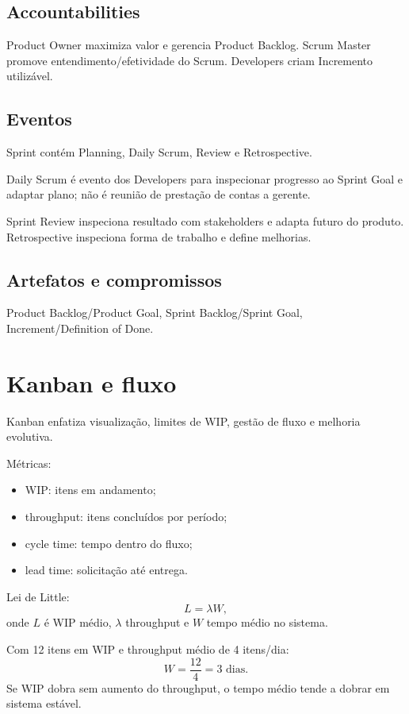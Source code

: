\subsection{Accountabilities}

Product Owner maximiza valor e gerencia Product Backlog. Scrum Master promove entendimento/efetividade do Scrum. Developers criam Incremento utilizável.

\subsection{Eventos}

Sprint contém Planning, Daily Scrum, Review e Retrospective.

Daily Scrum é evento dos Developers para inspecionar progresso ao Sprint Goal e adaptar plano; não é reunião de prestação de contas a gerente.

Sprint Review inspeciona resultado com stakeholders e adapta futuro do produto. Retrospective inspeciona forma de trabalho e define melhorias.

\subsection{Artefatos e compromissos}

Product Backlog/Product Goal, Sprint Backlog/Sprint Goal, Increment/Definition of Done.

\section{Kanban e fluxo}

Kanban enfatiza visualização, limites de WIP, gestão de fluxo e melhoria evolutiva.

Métricas:
\begin{itemize}
\item WIP: itens em andamento;
\item throughput: itens concluídos por período;
\item cycle time: tempo dentro do fluxo;
\item lead time: solicitação até entrega.
\end{itemize}

Lei de Little:
\[
L=\lambda W,
\]
onde $L$ é WIP médio, $\lambda$ throughput e $W$ tempo médio no sistema.

\begin{exemplo}
Com 12 itens em WIP e throughput médio de 4 itens/dia:
\[
W=\frac{12}{4}=3\text{ dias}.
\]
Se WIP dobra sem aumento do throughput, o tempo médio tende a dobrar em sistema estável.
\end{exemplo}

